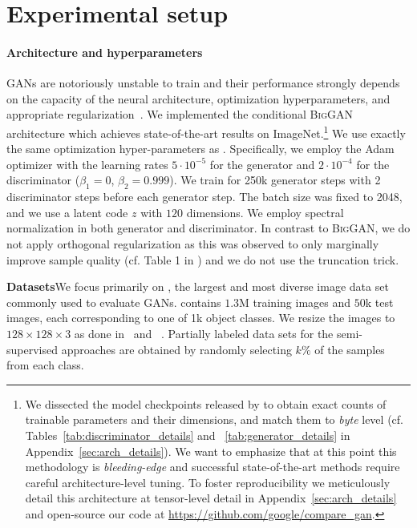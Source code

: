 \documentclass{article}
\newcommand{\biggan}{\textsc{BigGAN}}
\begin{document}
\section{Experimental setup}\label{exp:setup}

\paragraph{Architecture and hyperparameters} 
GANs are notoriously unstable to train and their performance strongly depends on the capacity of the neural architecture, optimization hyperparameters, and appropriate regularization~\cite{lucic2018,kurach2018gan}. We implemented the conditional \biggan{} architecture \cite{brock2018large} which achieves state-of-the-art results on ImageNet.\footnote{We dissected the model checkpoints released by \citet{brock2018large} to obtain exact counts of trainable parameters and their dimensions, and match them to \emph{byte} level (cf. Tables~\ref{tab:discriminator_details} and ~\ref{tab:generator_details} in Appendix~\ref{sec:arch_details}). We want to emphasize that at this point this methodology is \emph{bleeding-edge} and successful state-of-the-art methods require careful architecture-level tuning. To foster reproducibility we meticulously detail this architecture at tensor-level detail in Appendix~\ref{sec:arch_details} and open-source our code at \url{https://github.com/google/compare_gan}.}  We use exactly the same optimization hyper-parameters as \citet{brock2018large}. Specifically, we employ the Adam optimizer with the learning rates $5\cdot10^{-5}$ for the generator and $2\cdot10^{-4}$ for the discriminator ($\beta_1=0$, $\beta_2=0.999$). We train for 250k generator steps with 2 discriminator steps before each generator step. The batch size was fixed to 2048, and we use a latent code $z$ with $120$ dimensions. We employ spectral normalization in both generator and discriminator. In contrast to \biggan{}, we do not apply orthogonal regularization as this was observed to only marginally improve sample quality (cf. Table 1 in \citet{brock2018large}) and we do not use the truncation trick.


\textbf{Datasets}\quad We focus primarily on \imagenet{}, the largest and most diverse image data set commonly used to evaluate GANs. \imagenet{} contains $1.3$M training images and $50$k test images, each corresponding to one of 1k object classes. We resize the images to $128\times128\times3$ as done in~\citet{miyato2018cgans} and ~\citet{zhang2018self}. Partially labeled data sets for the semi-supervised approaches are obtained by randomly selecting $k\%$ of the samples from each class.
\end{document}
